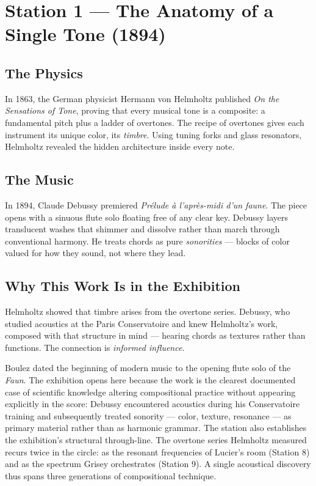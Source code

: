 \documentclass[11pt]{article}
\begin{document}
\section{Station 1 --- The Anatomy of a Single Tone (1894)}

\subsection{The Physics}
In 1863, the German physicist Hermann von Helmholtz published \emph{On the Sensations of
Tone}, proving that every musical tone is a composite: a fundamental pitch plus a ladder of
overtones. The recipe of overtones gives each instrument its unique color, its
\emph{timbre}. Using tuning forks and glass resonators, Helmholtz revealed the hidden
architecture inside every note.

\subsection{The Music}
In 1894, Claude Debussy premiered \emph{Pr\'elude \`a l'apr\`es-midi d'un faune}. The piece
opens with a sinuous flute solo floating free of any clear key. Debussy layers translucent
washes that shimmer and dissolve rather than march through conventional harmony. He treats
chords as pure \emph{sonorities} --- blocks of color valued for how they sound, not where
they lead.

\subsection{Why This Work Is in the Exhibition}
Helmholtz showed that timbre arises from the overtone series. Debussy, who studied acoustics
at the Paris Conservatoire and knew Helmholtz's work, composed with that structure in mind
--- hearing chords as textures rather than functions. The connection is \emph{informed
influence}.

Boulez dated the beginning of modern music to the opening flute solo of the \emph{Faun}. The
exhibition opens here because the work is the clearest documented case of scientific
knowledge altering compositional practice without appearing explicitly in the score: Debussy
encountered acoustics during his Conservatoire training and subsequently treated sonority ---
color, texture, resonance --- as primary material rather than as harmonic grammar. The
station also establishes the exhibition's structural through-line. The overtone series
Helmholtz measured recurs twice in the circle: as the resonant frequencies of Lucier's room
(Station 8) and as the spectrum Grisey orchestrates (Station 9). A single acoustical
discovery thus spans three generations of compositional technique.
\end{document}
